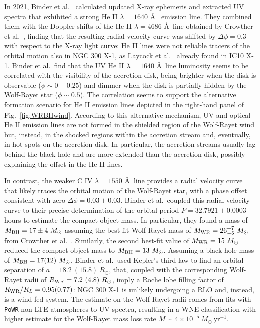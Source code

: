 \documentclass[a4paper,titlepage]{book}     	%
\newcommand{\sun}{\ensuremath{_\odot}}
\newcommand{\mdot}{\ensuremath{\dot{M}}}
\newcommand{\msun}{\ensuremath{M\sun}}
\newcommand{\rsun}{R_{\odot}}
\newcommand{\yr}{\text{yr}}
\newcommand{\mwr}{\ensuremath{M_\textup{WR}}}
\newcommand{\mbh}{\ensuremath{M_\textup{BH}}}
\begin{document}
In 2021, Binder et al.\ \cite{NGC300X-1_Binder2021_BHpreciso} calculated updated X-ray ephemeris and extracted UV spectra that exhibited a strong He II $\lambda=1640$ \AA~ emission line. They combined them with the Doppler shifts of the He II $\lambda=4686$ \AA ~line obtained by Crowther et al.\ \cite{NGC300X-1_Crowther2010}, finding that the resulting radial velocity curve was shifted by $\Delta \phi = 0.3$ with respect to the X-ray light curve: He II lines were not reliable tracers of the orbital motion also in NGC 300 X-1, as Laycock et al.\ \cite{laycock2015_IC10X1_measuredshift} already found in IC10 X-1. Binder et al.\ find that the UV He II $\lambda=1640$ \AA~line luminosity seems to be correlated with the visibility of the accretion disk, being brighter when the disk is observable ($\phi \sim 0-0.25$) and dimmer when the disk is partially hidden by the Wolf-Rayet star ($\phi \sim 0.5$). The correlation seems to support the alternative formation scenario for He II emission lines depicted in the right-hand panel of Fig.\ \ref{fig:WRBHwind}. According to this alternative mechanism, UV and optical He II emission lines are not formed in the shielded region of the Wolf-Rayet wind but, instead, in the shocked regions within the accretion stream and, eventually, in hot spots on the accretion disk. In particular, the accretion streams usually lag behind the black hole and are more extended than the accretion disk, possibly explaining the offset in the He II lines.

In contrast, the weaker C IV $\lambda=1550$ \AA~line provides a radial velocity curve that likely traces the orbital motion of the Wolf-Rayet star, with a phase offset consistent with zero $\Delta \phi = 0.03 \pm 0.03$. Binder et al.\ coupled this radial velocity curve to their precise determination of the orbital period $P=32.7921 \pm 0.0003$ hours to estimate the compact object mass. In particular, they found a mass of $\mbh = 17 \pm 4~\msun$ assuming the best-fit Wolf-Rayet mass of $\mwr = 26_{-5}^{+7}~\msun$ from Crowther et al.\ \cite{NGC300X-1_Crowther2010}. Similarly, the second best-fit value of $\mwr = 15~\msun$ reduced the compact object mass to $\mbh = 13~\msun$. Assuming a black hole mass of $\mbh = 17(12)~\msun$, Binder et al.\ used Kepler's third law to find an orbital separation of $a = 18.2~(15.8)~\rsun$, that, coupled with the corresponding Wolf-Rayet radii of $R_{\rm WR} = 7.2~(4.8)~\rsun$, imply a Roche lobe filling factor of $R_{\rm WR}/R_L = 0.95 (0.77)$: NGC 300 X-1 is unlikely undergoing a RLO and, instead, is a wind-fed system. The estimate on the Wolf-Rayet radii comes from fits with \texttt{PoWR} non-LTE atmospheres \cite{WRnonLTEatmospheresPoWR_Todt2015} to UV spectra, resulting in a WNE classification with higher estimate for the Wolf-Rayet mass loss rate $\mdot \sim 4 \times 10^{-5}~\msun~\yr^{-1}$.
\end{document}

